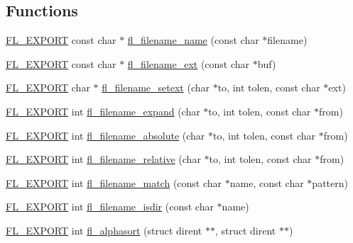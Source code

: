 \subsection*{Functions}
\begin{DoxyCompactItemize}
\item 
\hyperlink{_fl___export_8_h_aa9ba29a18aee9d738370a06eeb4470fc}{F\+L\+\_\+\+E\+X\+P\+O\+RT} const char $\ast$ \hyperlink{group__filenames_ga0ac0f44a1709c6ff94f56a8954dc8fd6}{fl\+\_\+filename\+\_\+name} (const char $\ast$filename)
\item 
\hyperlink{_fl___export_8_h_aa9ba29a18aee9d738370a06eeb4470fc}{F\+L\+\_\+\+E\+X\+P\+O\+RT} const char $\ast$ \hyperlink{group__filenames_gaccd45892153d060516a1571335e60a2a}{fl\+\_\+filename\+\_\+ext} (const char $\ast$buf)
\item 
\hyperlink{_fl___export_8_h_aa9ba29a18aee9d738370a06eeb4470fc}{F\+L\+\_\+\+E\+X\+P\+O\+RT} char $\ast$ \hyperlink{group__filenames_ga957325ab216ec3290693a737ac8881a3}{fl\+\_\+filename\+\_\+setext} (char $\ast$to, int tolen, const char $\ast$ext)
\item 
\hyperlink{_fl___export_8_h_aa9ba29a18aee9d738370a06eeb4470fc}{F\+L\+\_\+\+E\+X\+P\+O\+RT} int \hyperlink{group__filenames_gabf6091d3cad1ec774ba8d2608994be6c}{fl\+\_\+filename\+\_\+expand} (char $\ast$to, int tolen, const char $\ast$from)
\item 
\hyperlink{_fl___export_8_h_aa9ba29a18aee9d738370a06eeb4470fc}{F\+L\+\_\+\+E\+X\+P\+O\+RT} int \hyperlink{group__filenames_ga501ffe4287dfd36c8cb56a42c9c4b34c}{fl\+\_\+filename\+\_\+absolute} (char $\ast$to, int tolen, const char $\ast$from)
\item 
\hyperlink{_fl___export_8_h_aa9ba29a18aee9d738370a06eeb4470fc}{F\+L\+\_\+\+E\+X\+P\+O\+RT} int \hyperlink{group__filenames_gaf0cfb5d9ee6743caf9ede70032bd2a9b}{fl\+\_\+filename\+\_\+relative} (char $\ast$to, int tolen, const char $\ast$from)
\item 
\hyperlink{_fl___export_8_h_aa9ba29a18aee9d738370a06eeb4470fc}{F\+L\+\_\+\+E\+X\+P\+O\+RT} int \hyperlink{group__filenames_gac4b44c55216afb84a7a9e75bd8b65793}{fl\+\_\+filename\+\_\+match} (const char $\ast$name, const char $\ast$pattern)
\item 
\hyperlink{_fl___export_8_h_aa9ba29a18aee9d738370a06eeb4470fc}{F\+L\+\_\+\+E\+X\+P\+O\+RT} int \hyperlink{group__filenames_gaf8e5802ecf4af833172c20dd8d22b0e3}{fl\+\_\+filename\+\_\+isdir} (const char $\ast$name)
\item 
\hyperlink{_fl___export_8_h_aa9ba29a18aee9d738370a06eeb4470fc}{F\+L\+\_\+\+E\+X\+P\+O\+RT} int \hyperlink{group__filenames_ga09750e351834b0d9def73b546e883a7e}{fl\+\_\+alphasort} (struct dirent $\ast$$\ast$, struct dirent $\ast$$\ast$)

\end{DoxyCompactItemize}
